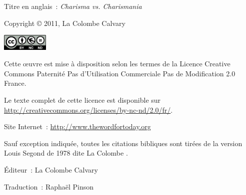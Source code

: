 \newpage
\mbox{}
\vfill
\noindent Titre en anglais~: \emph{Charisma vs. Charismania}

\noindent Copyright \copyright{} 2011, La Colombe Calvary


\noindent \includegraphics[width=6em]{by-nc-nd_eu}

\noindent Cette \oe{}uvre est mise à disposition selon les termes de la
 Licence Creative Commons Paternité
 \ocadr Pas d'Utilisation Commerciale \ocadr Pas de Modification 2.0 France.

\noindent Le texte complet de cette licence est disponible sur \\
 \url{http://creativecommons.org/licenses/by-nc-nd/2.0/fr/}.

\noindent Site Internet~: \url{http://www.thewordfortoday.org}

\noindent Sauf exception indiquée, toutes les citations bibliques sont
 tirées de la version Louis Segond de 1978 dite \og La Colombe \fg{}.

\noindent Éditeur~: La Colombe Calvary

\noindent Traduction~: Raphaël Pinson

